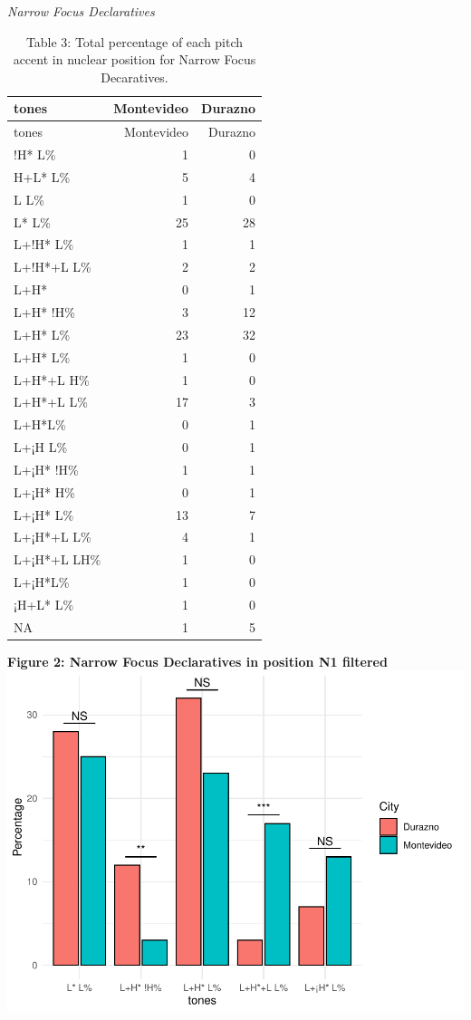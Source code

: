 \documentclass[
  man]{apa6}
\begin{document}
\emph{Narrow Focus Declaratives}

\begin{longtable}[]{@{}lrr@{}}
\caption{\label{tab:unnamed-chunk-6}Table 3: Total percentage of each pitch accent in nuclear position for Narrow Focus Decaratives.}\tabularnewline
\toprule\noalign{}
tones & Montevideo & Durazno \\
\midrule\noalign{}
\endfirsthead
\toprule\noalign{}
tones & Montevideo & Durazno \\
\midrule\noalign{}
\endhead
\bottomrule\noalign{}
\endlastfoot
!H* L\% & 1 & 0 \\
H+L* L\% & 5 & 4 \\
L L\% & 1 & 0 \\
L* L\% & 25 & 28 \\
L+!H* L\% & 1 & 1 \\
L+!H*+L L\% & 2 & 2 \\
L+H* & 0 & 1 \\
L+H* !H\% & 3 & 12 \\
L+H* L\% & 23 & 32 \\
L+H* L\% & 1 & 0 \\
L+H*+L H\% & 1 & 0 \\
L+H*+L L\% & 17 & 3 \\
L+H*L\% & 0 & 1 \\
L+¡H L\% & 0 & 1 \\
L+¡H* !H\% & 1 & 1 \\
L+¡H* H\% & 0 & 1 \\
L+¡H* L\% & 13 & 7 \\
L+¡H*+L L\% & 4 & 1 \\
L+¡H*+L LH\% & 1 & 0 \\
L+¡H*L\% & 1 & 0 \\
¡H+L* L\% & 1 & 0 \\
NA & 1 & 5 \\
\end{longtable}

\textbf{Figure 2: Narrow Focus Declaratives in position N1 filtered}
\includegraphics{main_files/figure-latex/unnamed-chunk-7-1.pdf}
\end{document}
